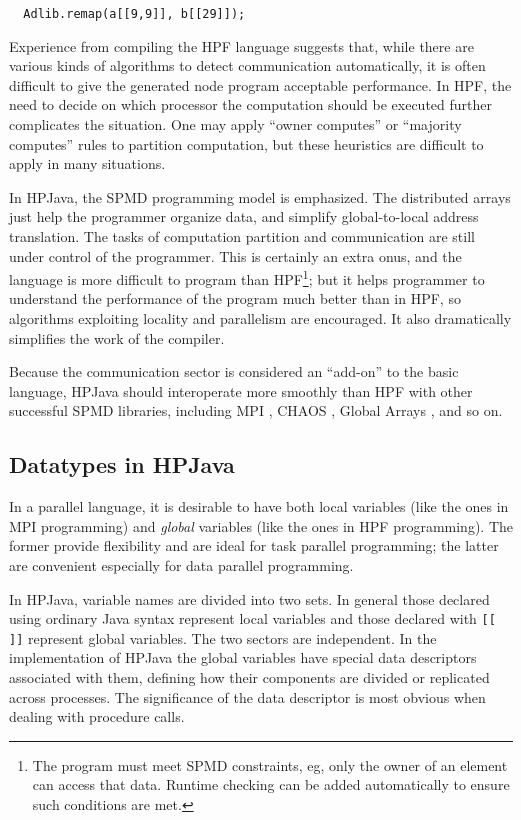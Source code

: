 \begin{small}
\begin{verbatim}
  Adlib.remap(a[[9,9]], b[[29]]);
\end{verbatim}
\end{small}
Experience from compiling the HPF language suggests that, while there
are various kinds of algorithms to detect communication automatically,
it is often difficult to give the generated node program acceptable
performance.  In HPF, the need to decide on which processor the
computation should be executed further complicates the situation.  One
may apply ``owner computes'' or ``majority computes'' rules to
partition computation, but these heuristics are difficult to apply in
many situations.

In HPJava, the SPMD programming model is emphasized.  The distributed
arrays just help the programmer organize data, and simplify
global-to-local address translation.  The tasks of computation
partition and communication are still under control of the programmer.
This is certainly an extra onus, and the language is more difficult to
program than HPF\footnote{The program must meet SPMD constraints, eg,
only the owner of an element can access that data.  Runtime checking
can be added automatically to ensure such conditions are met.}; but
it helps programmer to understand the performance of the program much
better than in HPF, so algorithms exploiting locality and parallelism
are encouraged.  It also dramatically simplifies the work of the
compiler.

Because the communication sector is considered an ``add-on'' to the
basic language, HPJava should interoperate more smoothly than HPF with
other successful SPMD libraries, including MPI \cite{MPIStandard},
CHAOS \cite{CHAOS}, Global Arrays \cite{Global_Arrays},
and so on.

\subsection{Datatypes in HPJava}

In a parallel language, it is desirable to have both local variables
(like the ones in MPI programming) and \emph{global} variables (like
the ones in HPF programming).  The former provide flexibility and are
ideal for task parallel programming; the latter are convenient
especially for data parallel programming.

In HPJava, variable names are divided into two sets.  
In general those declared
using ordinary Java syntax represent local variables and those
declared with \texttt{[[ ]]} represent global variables.
The two sectors are independent.
In the implementation of HPJava the global variables have special data
descriptors associated with them, defining how their components are
divided or replicated across processes.
The significance of the data descriptor is most obvious when
dealing with procedure calls.  

